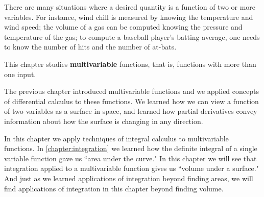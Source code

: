 There are many situations where a desired quantity is a function of two or more variables. For instance, wind chill is measured by knowing the temperature and wind speed; the volume of a gas can be computed knowing the pressure and temperature of the gas; to compute a baseball player's batting average, one needs to know the number of hits and the number of at-bats. 

This chapter studies \textbf{multivariable} functions, that is, functions with more than one input.













The previous chapter introduced multivariable functions and we applied concepts of differential calculus to these functions. We learned how we can view a function of two variables as a surface in space, and learned how partial derivatives convey  information about how the surface is changing in any direction.

In this chapter we apply techniques of integral calculus to multivariable functions. In \autoref{chapter:integration} we learned how the definite integral of a single variable function gave us ``area under the curve." In this chapter we will see that integration applied to a multivariable function gives us ``volume under a surface." And just as we learned applications of integration beyond finding areas, we will find applications of integration in this chapter beyond finding volume.








%

%
%
%
%
%
%
%










\cleardoublepage

